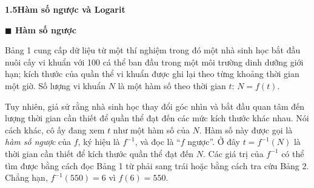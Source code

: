 \begin{minipage}[t]{0.708\textwidth}
    \fontsize{9.3pt}{13.2pt}\selectfont
    
    \noindent
    {\fontsize{19pt}{22pt}\selectfont\textbf{\textsf{\textcolor{stewartcyan}{1.5}\quad Hàm số ngược và Logarit}}}
    \vspace{0.8em}

    \noindent
    \textbf{\textsf{\textcolor{stewartcyan}{$\blacksquare$}\; Hàm số ngược}}
    \vspace{0.4em}

    \noindent
    Bảng 1 cung cấp dữ liệu từ một thí nghiệm trong đó một nhà sinh học bắt đầu nuôi cấy vi khuẩn với 100 cá thể ban đầu trong một môi trường dinh dưỡng giới hạn; kích thước của quần thể vi khuẩn được ghi lại theo từng khoảng thời gian một giờ. Số lượng vi khuẩn $N$ là một hàm số theo thời gian $t$: $N = f(t)$.

    Tuy nhiên, giả sử rằng nhà sinh học thay đổi góc nhìn và bắt đầu quan tâm đến lượng thời gian cần thiết để quần thể đạt đến các mức kích thước khác nhau. Nói cách khác, cô ấy đang xem $t$ như một hàm số của $N$. Hàm số này được gọi là \emph{hàm số ngược} của $f$, ký hiệu là $f^{-1}$, và đọc là “$f$ ngược”. Ở đây $t = f^{-1}(N)$ là thời gian cần thiết để kích thước quần thể đạt đến $N$. Các giá trị của $f^{-1}$ có thể tìm được bằng cách đọc Bảng 1 từ phải sang trái hoặc bằng cách tra cứu Bảng 2. Chẳng hạn, $f^{-1}(550) = 6$ vì $f(6) = 550$.


\end{minipage}
